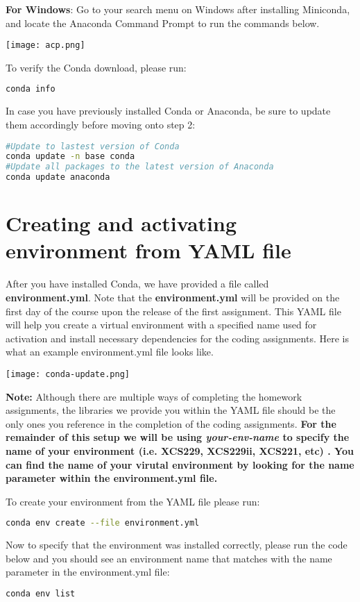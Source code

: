 \documentclass{article}
\begin{document}
\textbf{For Windows}: Go to your search menu on Windows after installing Miniconda, and locate the Anaconda Command Prompt to run the commands below.
\begin{center}
   \texttt{[image: acp.png]} 
\end{center}


To verify the Conda download, please run: 
\begin{lstlisting}[language=bash] 
conda info
\end{lstlisting}
In case you have previously installed Conda or Anaconda, be sure to update them accordingly before moving onto step 2:
\begin{lstlisting}[language=bash] 
#Update to lastest version of Conda
conda update -n base conda
#Update all packages to the latest version of Anaconda
conda update anaconda
\end{lstlisting}

\section{Creating and activating environment from YAML file}

After you have installed Conda, we have provided a file called \textbf{environment.yml}. Note that the \textbf{environment.yml} will be provided on the first day of the course upon the release of the first assignment. This YAML file will help you create a virtual environment with a specified name used for activation and install necessary dependencies for the coding assignments. Here is what an example environment.yml file looks like.
\begin{center}
\texttt{[image: conda-update.png]}
\end{center}
\textbf{Note: }Although there are multiple ways of completing the homework assignments, the libraries we provide you within the YAML file should be the only ones you reference in the completion of the coding assignments. 
\textbf{For the remainder of this setup we will be using \textit{your-env-name} to specify the name of your environment (i.e. XCS229, XCS229ii, XCS221, etc) . You can find the name of your virutal environment by looking for the name parameter within the environment.yml file.} 

To create your environment from the YAML file please run: 
\begin{lstlisting}[language=bash]
conda env create --file environment.yml
\end{lstlisting}
Now to specify that the environment was installed correctly, please run the code below and you should see an environment name that matches with the name parameter in the environment.yml file:
\begin{lstlisting}[language=bash]
conda env list
\end{lstlisting}
\end{document}

